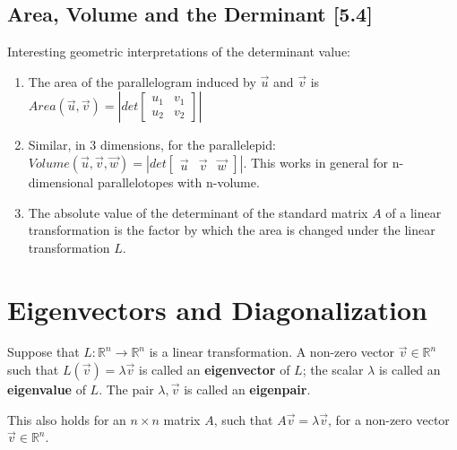 \documentclass[a4paper,9pt]{extarticle}
\begin{document}
\begin{multicols*}{2}

\subsection{Area, Volume and the Derminant [5.4]}
Interesting geometric interpretations of the determinant value:

\begin{enumerate}[label=\bfseries (\arabic*)] \itemsep0pt \parskip0pt 
    \item The area of the parallelogram induced by $\vec{u}$ and $\vec{v}$ is $Area(\vec{u}, \vec{v}) = |det \begin{bmatrix}u_1 & v_1 \\ u_2 & v_2 \end{bmatrix}|$
    \item Similar, in 3 dimensions, for the parallelepid: $Volume(\vec{u}, \vec{v}, \vec{w}) = |det \begin{bmatrix}\vec{u} & \vec{v} & \vec{w}\end{bmatrix}|$. This works in general for n-dimensional parallelotopes with n-volume.
    \item The absolute value of the determinant of the standard matrix $A$ of a linear transformation is the factor by which the area is changed under the linear transformation $L$.
\end{enumerate}




\section{Eigenvectors and Diagonalization}

Suppose that $L : \mathbb{R}^n \to \mathbb{R}^n$ is a linear transformation. A non-zero vector $\vec{v} \in \mathbb{R}^n$ such that $L(\vec{v}) = \lambda \vec{v}$ is called an \textbf{eigenvector} of $L$; the scalar $\lambda$ is called an \textbf{eigenvalue} of $L$. The pair $\lambda, \vec{v}$ is called an \textbf{eigenpair}.

This also holds for an $n \times n$ matrix $A$, such that $A \vec{v} = \lambda \vec{v}$, for a non-zero vector $\vec{v} \in \mathbb{R}^n$.



\end{multicols*}
\end{document}
